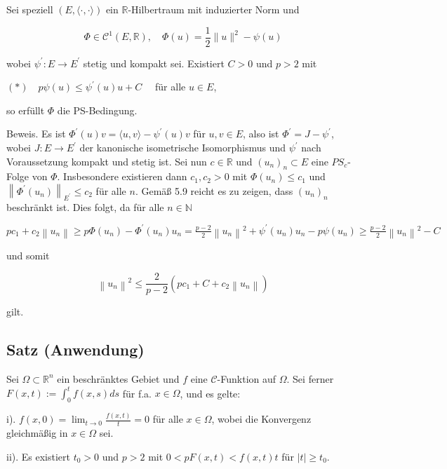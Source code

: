 \documentclass[10pt, letterpaper]{article}
\begin{document}
Sei speziell $(E,\langle\cdot, \cdot\rangle)$ ein $\mathbb{R}$-Hilbertraum mit induzierter Norm und

$$
\Phi \in \mathcal{C}^{1}(E, \mathbb{R}), \quad \Phi(u)=\frac{1}{2}\|u\|^{2}-\psi(u)
$$

wobei $\psi^{\prime}: E \rightarrow E^{\prime}$ stetig und kompakt sei. Existiert $C>0$ und $p>2$ mit

$(*) \quad p \psi(u) \leq \psi^{\prime}(u) u+C \quad$ für alle $u \in E$,

so erfüllt $\Phi$ die PS-Bedingung.

Beweis. Es ist $\Phi^{\prime}(u) v=\langle u, v\rangle-\psi^{\prime}(u) v$ für $u, v \in E$, also ist $\Phi^{\prime}=J-\psi^{\prime}$, wobei $J: E \rightarrow E^{\prime}$ der kanonische isometrische Isomorphismus und $\psi^{\prime}$ nach Voraussetzung kompakt und stetig ist. Sei nun $c \in \mathbb{R}$ und $\left(u_{n}\right)_{n} \subset E$ eine $P S_{c}$-Folge von $\Phi$. Insbesondere existieren dann $c_{1}, c_{2}>0$ mit $\Phi\left(u_{n}\right) \leq c_{1}$ und $\left\|\Phi^{\prime}\left(u_{n}\right)\right\|_{E^{\prime}} \leq c_{2}$ für alle $n$. Gemäß 5.9 reicht es zu zeigen, dass $\left(u_{n}\right)_{n}$ beschränkt ist. Dies folgt, da für alle $n \in \mathbb{N}$

$p c_{1}+c_{2}\left\|u_{n}\right\| \geq p \Phi\left(u_{n}\right)-\Phi^{\prime}\left(u_{n}\right) u_{n}=\frac{p-2}{2}\left\|u_{n}\right\|^{2}+\psi^{\prime}\left(u_{n}\right) u_{n}-p \psi\left(u_{n}\right) \geq \frac{p-2}{2}\left\|u_{n}\right\|^{2}-C$

und somit

$$
\left\|u_{n}\right\|^{2} \leq \frac{2}{p-2}\left(p c_{1}+C+c_{2}\left\|u_{n}\right\|\right)
$$

gilt.

\subsection*{Satz (Anwendung)}

Sei $\Omega \subset \mathbb{R}^{n}$ ein beschränktes Gebiet und $f$ eine $\mathcal{C}$-Funktion auf $\Omega$. Sei ferner $F(x, t):=\int_{0}^{t} f(x, s) d s$ für f.a. $x \in \Omega$, und es gelte:

i). $f(x, 0)=\lim _{t \rightarrow 0} \frac{f(x, t)}{t}=0$ für alle $x \in \Omega$, wobei die Konvergenz gleichmäßig in $x \in \Omega$ sei.

ii). Es existiert $t_{0}>0$ und $p>2$ mit $0<p F(x, t)<f(x, t) t$ für $|t| \geq t_{0}$.
\end{document}
